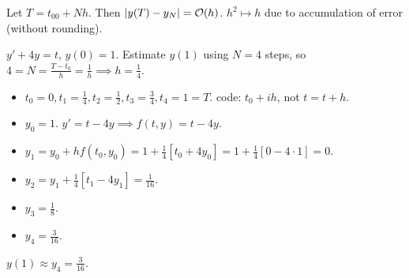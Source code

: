 \documentclass[]{article}
\begin{document}
\begin{fact}
	Let $T=t_00+Nh$. Then $|y(T)-y_N|=\mathcal{O}(h)$. $h^2\mapsto h$ due to accumulation of error (without rounding).
\end{fact}
\begin{example}
	$y'+4y=t$, $y(0)=1$.
	Estimate $y(1)$ using $N=4$ steps, so $4=N=\frac{T-t_0}h = \frac1h\implies h=\frac14$.
	\begin{itemize}
		\item $t_0=0,t_1=\frac14,t_2=\frac12,t_3=\frac34,t_4=1=T$. code: $t_0+ih$, not $t=t+h$.
		\item $y_0=1$. $y' = t-4y \implies f(t,y) = t-4y$.
		\item $y_1 = y_0 + hf(t_0,y_0) = 1+\frac14[t_0+4y_0] = 1+\frac14[0-4\cdot1] = 0$.
		\item $y_2 = y_1 + \frac14[t_1-4y_1] = \frac1{16}$.
		\item $y_3 = \frac18$.
		\item $y_4 = \frac3{16}$.
	\end{itemize}
	$y(1) \approx y_4 = \frac3{16}$.
\end{example}
\end{document}
